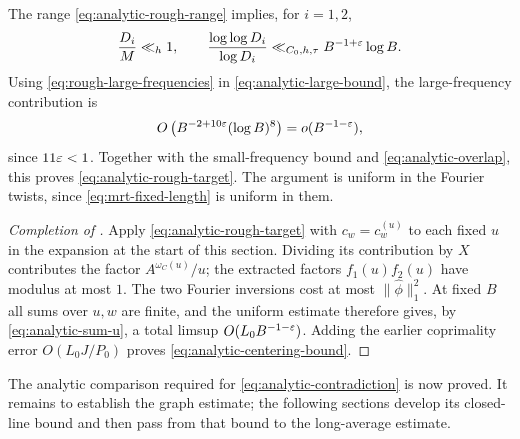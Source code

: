 The range \eqref{eq:analytic-rough-range} implies, for $i=1,2$,
\[
 \frac{D_i}{M}\ll_h1,
 \qquad
 \frac{\log\log D_i}{\log D_i}
 \ll_{C_0,h,\tau}B^{-1+\varepsilon}\log B.
\]
Using \eqref{eq:rough-large-frequencies} in
\eqref{eq:analytic-large-bound}, the large-frequency contribution is
\[
 O\left(B^{-2+10\varepsilon}(\log B)^8\right)
   =o(B^{-1-\varepsilon}),
\]
since $11\varepsilon<1$. Together with the small-frequency bound and
\eqref{eq:analytic-overlap}, this proves
\eqref{eq:analytic-rough-target}. The argument is uniform in the
Fourier twists, since \eqref{eq:mrt-fixed-length} is uniform in them.

\begin{proof}[Completion of ]
Apply \eqref{eq:analytic-rough-target} with $c_w=c_w^{(u)}$ to each fixed
$u$ in the expansion at the start of this section. Dividing its contribution by
$X$ contributes the factor $A^{\omega_C(u)}/u$; the extracted factors
$f_1(u)f_2(u)$ have modulus at most $1$.
The two Fourier inversions cost at most $\|\widehat\phi\|_1^2$.
At fixed $B$ all sums over $u,w$ are finite, and the uniform estimate
therefore gives, by \eqref{eq:analytic-sum-u}, a total limsup
$O(L_0B^{-1-\varepsilon})$. Adding the earlier coprimality error
$O(L_0J/P_0)$ proves \eqref{eq:analytic-centering-bound}.
\end{proof}

The analytic comparison required for
\eqref{eq:analytic-contradiction} is now proved. It remains to establish
the graph estimate; the following sections develop its closed-line
bound and then pass from that bound to the long-average estimate.
